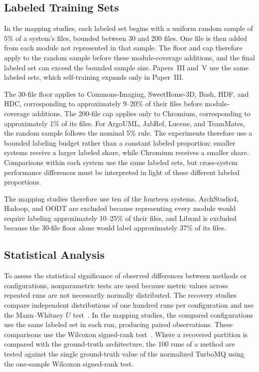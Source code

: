 \subsection{Labeled Training Sets}
In the mapping studies, each labeled set begins with a uniform random sample of 5\% of a system's files, bounded between 30 and 200 files. One file is then added from each module not represented in that sample. The floor and cap therefore apply to the random sample before these module-coverage additions, and the final labeled set can exceed the bounded sample size. Papers~III and~V use the same labeled sets, which self-training expands only in Paper~III.
 
The 30-file floor applies to Commons-Imaging, SweetHome-3D, Bash, HDF, and HDC, corresponding to approximately 9--20\% of their files before module-coverage additions. The 200-file cap applies only to Chromium, corresponding to approximately 1\% of its files. For ArgoUML, JabRef, Lucene, and TeamMates, the random sample follows the nominal 5\% rule. The experiments therefore use a bounded labeling budget rather than a constant labeled proportion: smaller systems receive a larger labeled share, while Chromium receives a smaller share. Comparisons within each system use the same labeled sets, but cross-system performance differences must be interpreted in light of these different labeled proportions.
 
The mapping studies therefore use ten of the fourteen systems. ArchStudio4, Hadoop, and OODT are excluded because representing every module would require labeling approximately 10--25\% of their files, and Libxml is excluded because the 30-file floor alone would label approximately 37\% of its files.

\subsection{Statistical Analysis \label{sec:stat_analysis}}

To assess the statistical significance of observed differences between methods or configurations, nonparametric tests are used because metric values across repeated runs are not necessarily normally distributed. The recovery studies compare independent distributions of one hundred runs per configuration and use the Mann--Whitney $U$ test~\cite{mann}. In the mapping studies, the compared configurations use the same labeled set in each run, producing paired observations. These comparisons use the Wilcoxon signed-rank test~\cite{wilcoxon}. Where a recovered partition is compared with the ground-truth architecture, the 100 runs of a method are tested against the single ground-truth value of the normalized TurboMQ using the one-sample Wilcoxon signed-rank test.

